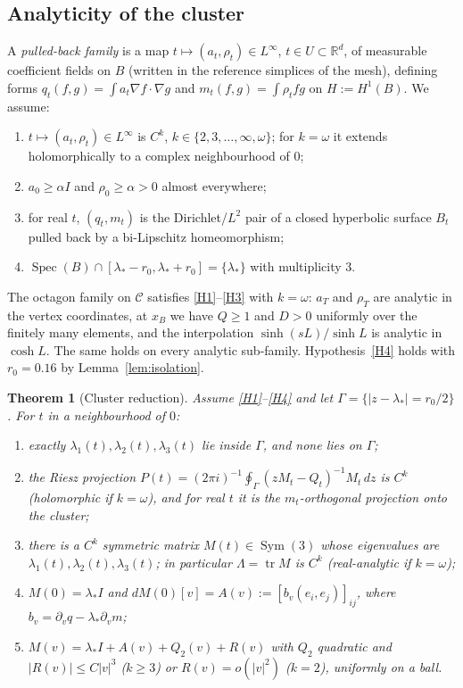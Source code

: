 \documentclass[11pt]{amsart}
\newtheorem{theorem}{Theorem}[section]
\theoremstyle{definition}
\theoremstyle{remark}
\newcommand{\R}{\mathbb{R}}
\newcommand{\Oct}{\mathcal{C}}
\newcommand{\Sym}{\operatorname{Sym}}
\newcommand{\tr}{\operatorname{tr}}
\newcommand{\Spec}{\operatorname{Spec}}
\newcommand{\ls}{\lambda_*}
\newcommand{\xB}{x_B}
\begin{document}
\subsection{Analyticity of the cluster}
A \emph{pulled-back family} is a map $t\mapsto(a_t,\rho_t)\in L^\infty$, $t\in U\subset\R^d$, of
measurable coefficient fields on $B$ (written in the reference simplices of the mesh), defining
forms $q_t(f,g)=\int a_t\nabla f\cdot\nabla g$ and $m_t(f,g)=\int\rho_tfg$ on $H:=H^1(B)$. We assume:
\begin{enumerate}[label=(H\arabic*)]
\item\label{H1} $t\mapsto(a_t,\rho_t)\in L^\infty$ is $C^k$, $k\in\{2,3,\dots,\infty,\omega\}$; for
$k=\omega$ it extends holomorphically to a complex neighbourhood of $0$;
\item\label{H2} $a_0\ge\alpha I$ and $\rho_0\ge\alpha>0$ almost everywhere;
\item\label{H3} for real $t$, $(q_t,m_t)$ is the Dirichlet/$L^2$ pair of a closed hyperbolic
surface $B_t$ pulled back by a bi-Lipschitz homeomorphism;
\item\label{H4} $\Spec(B)\cap[\ls-r_0,\ls+r_0]=\{\ls\}$ with multiplicity $3$.
\end{enumerate}
The octagon family on $\Oct$ satisfies \ref{H1}--\ref{H3} with $k=\omega$: $a_T$ and $\rho_T$ are
analytic in the vertex coordinates, at $\xB$ we have $Q\ge1$ and $D>0$ uniformly over the
finitely many elements, and the interpolation $\sinh(sL)/\sinh L$ is analytic in $\cosh L$. The
same holds on every analytic sub-family. Hypothesis~\ref{H4} holds with $r_0=0.16$ by
Lemma~\ref{lem:isolation}.

\begin{theorem}[Cluster reduction]\label{thm:F1}
Assume \ref{H1}--\ref{H4} and let $\Gamma=\{|z-\ls|=r_0/2\}$. For $t$ in a neighbourhood of $0$:
\begin{enumerate}
\item exactly $\lambda_1(t),\lambda_2(t),\lambda_3(t)$ lie inside $\Gamma$, and none lies on $\Gamma$;
\item the Riesz projection $P(t)=(2\pi i)^{-1}\oint_\Gamma(zM_t-Q_t)^{-1}M_t\,dz$ is $C^k$
(holomorphic if $k=\omega$), and for real $t$ it is the $m_t$-orthogonal projection onto the
cluster;
\item there is a $C^k$ symmetric matrix $M(t)\in\Sym(3)$ whose eigenvalues are
$\lambda_1(t),\lambda_2(t),\lambda_3(t)$; in particular $\Lambda=\tr M$ is $C^k$
(real-analytic if $k=\omega$);
\item $M(0)=\ls I$ and $dM(0)[v]=A(v):=[b_v(e_i,e_j)]_{ij}$, where
$b_v=\partial_vq-\ls\partial_vm$;
\item $M(v)=\ls I+A(v)+Q_2(v)+R(v)$ with $Q_2$ quadratic and $|R(v)|\le C|v|^3$ ($k\ge3$) or
$R(v)=o(|v|^2)$ ($k=2$), uniformly on a ball.
\end{enumerate}
\end{theorem}
\end{document}

